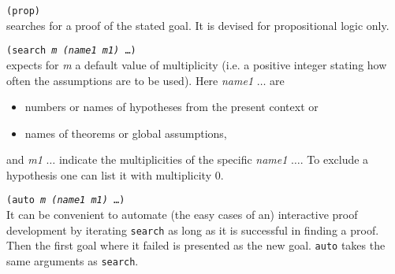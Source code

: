\documentclass[12pt]{amsart}
\begin{document}
\begin{appendix}
\texttt{(prop)}\\
searches for a proof of the stated goal.  It is devised for
propositional logic only.

\texttt{(search \textsl{m} \textsl{(name1 m1)} \dots)}%
\\
expects for \textsl{m} a default value of multiplicity (i.e. a
positive integer stating how often the assumptions are to be used).
Here \textsl{name1} $\dots$ are
\begin{itemize}
\item numbers or names of hypotheses from the present context or
\item names of theorems or global assumptions,
\end{itemize}
and \textsl{m1} $\dots$ indicate the multiplicities of the specific
\textsl{name1} $\dots$.
To exclude a hypothesis one can list it with multiplicity $0$.

\texttt{(auto \textsl{m} \textsl{(name1 m1)} \dots)}%
\\
It can be convenient to automate (the easy cases of an) interactive
proof development by iterating \texttt{search} as long as it is
successful in finding a proof.  Then the first goal where it failed is
presented as the new goal.  \texttt{auto} takes the same arguments as
\texttt{search}.


\end{appendix}
\end{document}
